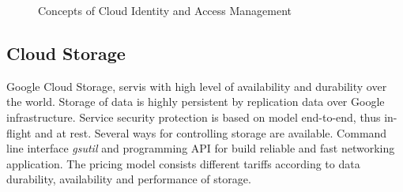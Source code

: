 \documentclass[a4paper,12pt,oneside]{report}
\begin{document}
	
	\begin{figure}[!htbp]
		\centering
		
		
		\caption[access]{Concepts of Cloud Identity and Access Management  
			\centering }
		\label{fig:iam}
	\end{figure}
	
	
	\subsection{Cloud Storage}
	\label{subsub:datastore}
	Google Cloud Storage, servis with high level of availability and durability 
	over the world. Storage of data is highly persistent by replication data over
	Google 
	infrastructure. Service security protection is based 
	on model end-to-end, thus in-flight and at rest.  Several ways for controlling
	storage are available. Command 
	line interface \textit{gsutil} and programming API for build 
	reliable and fast networking application. The pricing model consists different
	tariffs 
	according to data durability, availability and performance of storage.
	
\end{document}

